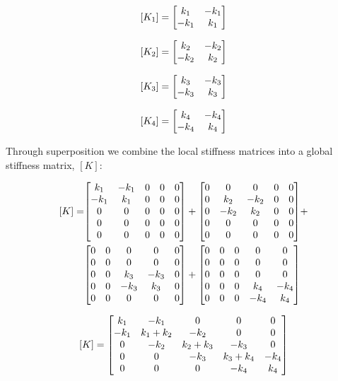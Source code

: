 \documentclass[../main.tex]{subfiles}
\begin{document}
\[
    [K_1] = \mqty[k_1 & -k_1\\ -k_1 & k_1]
\]

\[
    [K_2] = \mqty[k_2 & -k_2\\ -k_2 & k_2]
\]

\[
    [K_3] = \mqty[k_3 & -k_3\\ -k_3 & k_3]
\]

\[
    [K_4] = \mqty[k_4 & -k_4\\ -k_4 & k_4]
\]

Through superposition we combine the local stiffness matrices into a global stiffness matrix, \([K]\):

\[
    \begin{aligned}
    [K] = 
    &
    \mqty[
        k_1 & -k_1 & 0 & 0 & 0\\
        -k_1 & k_1 & 0 & 0 & 0\\
        0 & 0 & 0 & 0 & 0 \\
        0 & 0 & 0 & 0 & 0 \\
        0 & 0 & 0 & 0 & 0
    ]
    +
    \mqty[
        0 & 0 & 0 & 0 & 0\\
        0 & k_2 & -k_2 & 0 & 0\\
        0 & -k_2 & k_2 & 0 & 0 \\
        0 & 0 & 0 & 0 & 0 \\
        0 & 0 & 0 & 0 & 0
    ]
    +  \\
    &
    \mqty[
        0 & 0 & 0 & 0 & 0\\
        0 & 0 & 0 & 0 & 0\\
        0 & 0 & k_3 & -k_3 & 0 \\
        0 & 0 & -k_3 & k_3 & 0 \\
        0 & 0 & 0 & 0 & 0
    ]
    +
    \mqty[
        0 & 0 & 0 & 0 & 0\\
        0 & 0 & 0 & 0 & 0\\
        0 & 0 & 0 & 0 & 0 \\
        0 & 0 & 0 & k_4 & -k_4 \\
        0 & 0 & 0 & -k_4 & k_4
    ]
    \end{aligned}
\]

\[
    [K] =
    \mqty[
        k_1 & -k_1 & 0 & 0 & 0\\
        -k_1 & k_1+k_2 & -k_2 & 0 & 0\\
        0 & -k_2 & k_2+k_3 & -k_3 & 0 \\
        0 & 0 & -k_3 &k_3 + k_4 & -k_4 \\
        0 & 0 & 0 & -k_4 & k_4
    ]
\]
\end{document}
